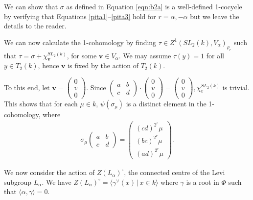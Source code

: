 We can show that $\sigma$ as defined in Equation \ref{eqn:b2a} is a well-defined 1-cocycle by verifying that Equations \ref{pita1}--\ref{pita3} hold for $r=\alpha, -\alpha$ but we leave the details to the reader.

We can now calculate the 1-cohomology by finding $\tau\in Z^1(SL_2(k), V_\alpha)_{\rho_r}$ such that $\tau = \sigma + \chi^{SL_2(k)}_\mathbf{v}$, for some $\mathbf{v}\in V_\alpha$. We may assume $\tau(y) = 1$ for all $y \in T_2(k)$, hence $\mathbf{v}$ is fixed by the action of $T_2(k)$. 

To this end, let $\mathbf{v} = \left(\begin{matrix}0\\v\\0\end{matrix}\right)$. Since
	$\left(\begin{matrix}a & b\\c & d\end{matrix}\right) \cdot \left(\begin{matrix}0\\v\\0\end{matrix}\right) =
	\left(\begin{matrix}0\\v\\0\end{matrix}\right),
\chi^{SL_2(k)}_v$ is trivial.
This shows that for each $\mu\in k$, $\psi(\sigma_\mu)$ is a distinct element in the 1-cohomology, where
\begin{align*}
	\sigma_\mu\left(\begin{matrix}a & b\\c & d\end{matrix}\right) = \left(\begin{matrix}(cd)^{2^r}\mu\\(bc)^{2^r}\mu\\(ad)^{2^r}\mu\end{matrix}\right).
\end{align*}

We now consider the action of $Z(L_\alpha)^\circ$, the connected centre of the Levi subgroup $L_\alpha$. We have $Z(L_\alpha)^\circ = \langle \gamma^\vee(x)\,|\,x \in k \rangle$ where $\gamma$ is a root in $\Phi$ such that $\langle \alpha, \gamma \rangle = 0$.

